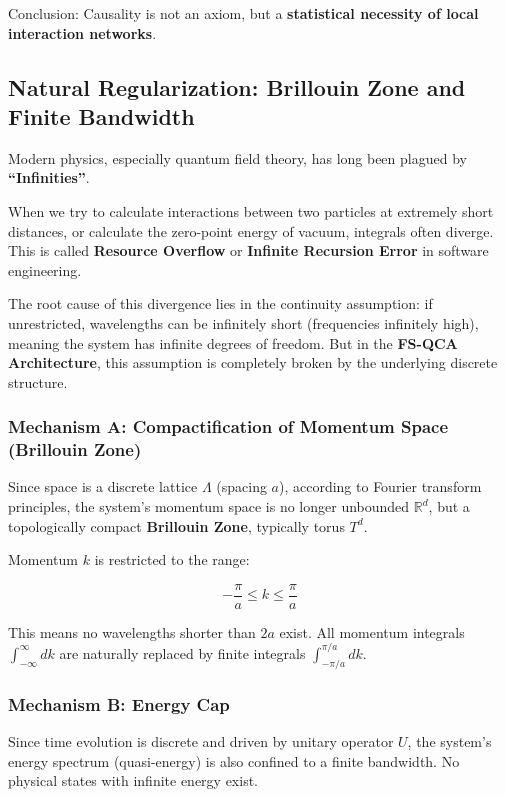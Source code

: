 Conclusion: Causality is not an axiom, but a \textbf{statistical necessity of local interaction networks}.

\subsection{Natural Regularization: Brillouin Zone and Finite Bandwidth}

Modern physics, especially quantum field theory, has long been plagued by \textbf{``Infinities''}.

When we try to calculate interactions between two particles at extremely short distances, or calculate the zero-point energy of vacuum, integrals often diverge. This is called \textbf{Resource Overflow} or \textbf{Infinite Recursion Error} in software engineering.

The root cause of this divergence lies in the continuity assumption: if unrestricted, wavelengths can be infinitely short (frequencies infinitely high), meaning the system has infinite degrees of freedom. But in the \textbf{FS-QCA Architecture}, this assumption is completely broken by the underlying discrete structure.

\subsubsection{Mechanism A: Compactification of Momentum Space (Brillouin Zone)}

Since space is a discrete lattice \textbf{$\Lambda$} (spacing \textbf{$a$}), according to Fourier transform principles, the system's momentum space is no longer unbounded \textbf{$\mathbb{R}^d$}, but a topologically compact \textbf{Brillouin Zone}, typically torus \textbf{$T^d$}.

Momentum \textbf{$k$} is restricted to the range:

$$-\frac{\pi}{a} \le k \le \frac{\pi}{a}$$

This means no wavelengths shorter than \textbf{$2a$} exist. All momentum integrals \textbf{$\int_{-\infty}^{\infty} dk$} are naturally replaced by finite integrals \textbf{$\int_{-\pi/a}^{\pi/a} dk$}.

\subsubsection{Mechanism B: Energy Cap}

Since time evolution is discrete and driven by unitary operator \textbf{$U$}, the system's energy spectrum (quasi-energy) is also confined to a finite bandwidth. No physical states with infinite energy exist.

